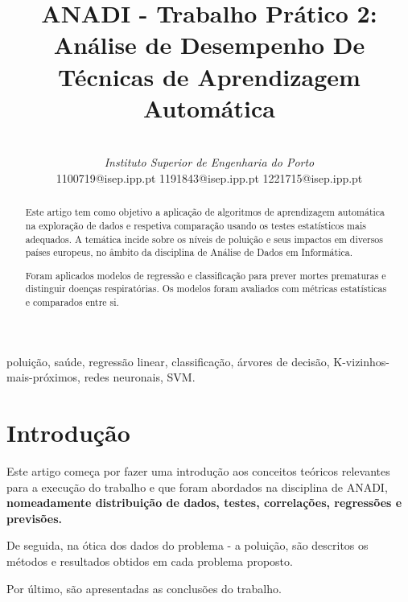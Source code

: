 \documentclass[conference]{IEEEtran}
\begin{document}
\title{ANADI - Trabalho Prático 2:\\
Análise de Desempenho De Técnicas de Aprendizagem Automática}

\author{
 \\
\textit{Instituto Superior de Engenharia do Porto}\\
 1100719@isep.ipp.pt
 1191843@isep.ipp.pt
 1221715@isep.ipp.pt
}


\maketitle

\begin{abstract}
Este artigo tem como objetivo a aplicação de algoritmos de aprendizagem automática na exploração de dados e respetiva comparação usando os testes estatísticos mais adequados. A temática incide sobre os níveis de poluição e seus impactos em diversos países europeus, no âmbito da disciplina de Análise de Dados em Informática. 

Foram aplicados modelos de regressão e classificação para prever mortes prematuras e distinguir doenças respiratórias. Os modelos foram avaliados com métricas estatísticas e comparados entre si.
\end{abstract}

\begin{IEEEkeywords}
poluição, saúde, regressão linear, classificação, árvores de decisão, K-vizinhos-mais-próximos, redes neuronais, SVM.
\end{IEEEkeywords}

\section{Introdução}

Este artigo começa por fazer uma introdução aos conceitos teóricos relevantes para a execução do trabalho e que foram abordados na disciplina de ANADI, \textbf{nomeadamente distribuição de dados, testes, correlações, regressões e previsões. }

De seguida, na ótica dos dados do problema - a poluição, são descritos os métodos e resultados obtidos em cada problema proposto. 

Por último, são apresentadas as conclusões do  trabalho.
\end{document}
